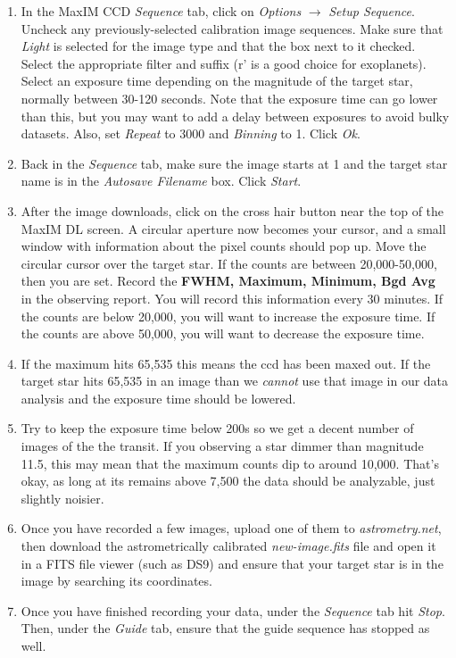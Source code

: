 \documentclass[11pt]{report}
\begin{document}
\begin{enumerate}
\item In the MaxIM CCD \emph{Sequence} tab, click on \emph{Options} {$\rightarrow$} \emph{Setup Sequence}. Uncheck any previously-selected calibration image sequences. Make sure that \emph{Light} is selected for the image type and that the box next to it checked. Select the appropriate filter and suffix (r' is a good choice for exoplanets). Select an exposure time depending on the magnitude of the target star, normally between 30-120 seconds. Note that the exposure time can go lower than this, but you may want to add a delay between exposures to avoid bulky datasets. Also, set \emph{Repeat} to 3000 and \emph{Binning} to 1. Click \emph{Ok}.
\item Back in the \emph{Sequence} tab, make sure the image starts at 1 and the target star name is in the \emph{Autosave Filename} box. Click \emph{Start}.
\item After the image downloads, click on the cross hair button near the top of the MaxIM DL screen. A circular aperture now becomes your cursor, and a small window with information about the pixel counts should pop up. Move the circular cursor over the target star. If the counts are between 20,000-50,000, then you are set. Record the {\bf FWHM, Maximum, Minimum, Bgd Avg} in the observing report. You will record this information every 30 minutes. If the counts are below 20,000, you will want to increase the exposure time. If the counts are above 50,000, you will want to decrease the exposure time.
\item If the maximum hits 65,535 this means the ccd has been maxed out. If the target star hits 65,535 in an image than we \emph{cannot} use that image in our data analysis and the exposure time should be lowered.
\item Try to keep the exposure time below 200s so we get a decent number of images of the the transit. If you observing a star dimmer than magnitude 11.5, this may mean that the maximum counts dip to around 10,000. That's okay, as long at its remains above 7,500 the data should be analyzable, just slightly noisier.
\item Once you have recorded a few images, upload one of them to \emph{astrometry.net}, then download the astrometrically calibrated \emph{new-image.fits} file and open it in a FITS file viewer (such as DS9) and ensure that your target star is in the image by searching its coordinates.
\item Once you have finished recording your data, under the \emph{Sequence} tab hit \emph{Stop}. Then, under the \emph{Guide} tab, ensure that the guide sequence has stopped as well.
\end{enumerate}
\end{document}
